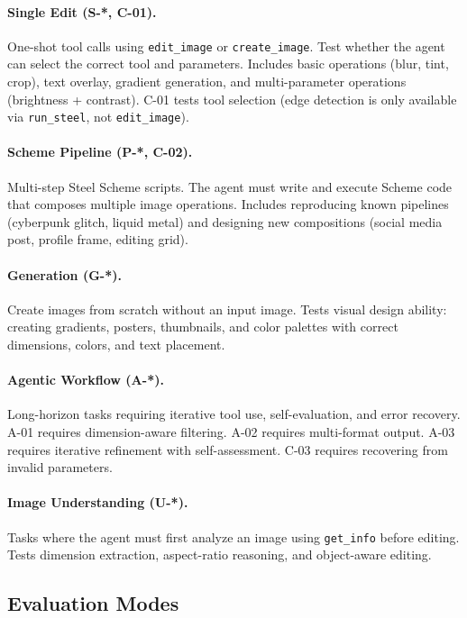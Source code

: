 \documentclass[11pt,a4paper]{article}
\begin{document}
\paragraph{Single Edit (S-*, C-01).}
One-shot tool calls using \texttt{edit\_image} or \texttt{create\_image}. Test whether the agent can select the correct tool and parameters. Includes basic operations (blur, tint, crop), text overlay, gradient generation, and multi-parameter operations (brightness + contrast). C-01 tests tool selection (edge detection is only available via \texttt{run\_steel}, not \texttt{edit\_image}).

\paragraph{Scheme Pipeline (P-*, C-02).}
Multi-step Steel Scheme scripts. The agent must write and execute Scheme code that composes multiple image operations. Includes reproducing known pipelines (cyberpunk glitch, liquid metal) and designing new compositions (social media post, profile frame, editing grid).

\paragraph{Generation (G-*).}
Create images from scratch without an input image. Tests visual design ability: creating gradients, posters, thumbnails, and color palettes with correct dimensions, colors, and text placement.

\paragraph{Agentic Workflow (A-*).}
Long-horizon tasks requiring iterative tool use, self-evaluation, and error recovery. A-01 requires dimension-aware filtering. A-02 requires multi-format output. A-03 requires iterative refinement with self-assessment. C-03 requires recovering from invalid parameters.

\paragraph{Image Understanding (U-*).}
Tasks where the agent must first analyze an image using \texttt{get\_info} before editing. Tests dimension extraction, aspect-ratio reasoning, and object-aware editing.

\subsection{Evaluation Modes}
\end{document}
